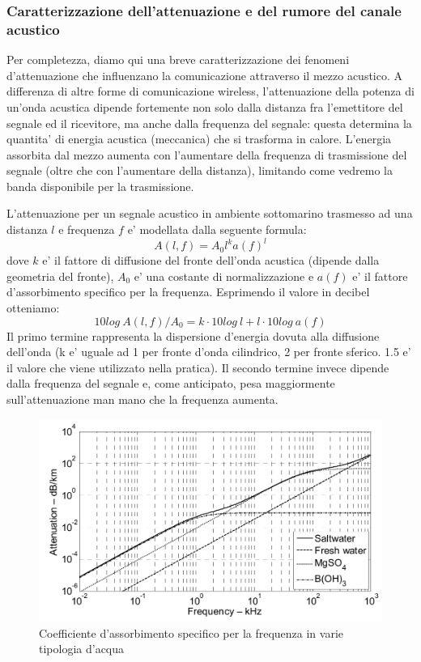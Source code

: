 \documentclass[Lau,binding=0.6cm]{sapthesis}
\begin{document}
\subsubsection{Caratterizzazione dell'attenuazione e del rumore del canale acustico}
\par
Per completezza, diamo qui una breve caratterizzazione dei fenomeni d'attenuazione che influenzano la comunicazione attraverso il mezzo acustico. A differenza di altre forme di comunicazione wireless, l'attenuazione della potenza di un'onda acustica dipende fortemente non solo dalla distanza fra l'emettitore del segnale ed il ricevitore, ma anche dalla frequenza del segnale: questa determina la quantita' di energia acustica (meccanica) che si trasforma in calore. L'energia assorbita dal mezzo aumenta con l'aumentare della frequenza di trasmissione del segnale (oltre che con l'aumentare della distanza), limitando come vedremo la banda disponibile per la trasmissione.

L'attenuazione per un segnale acustico in ambiente sottomarino trasmesso ad una distanza $l$ e frequenza $f$ e' modellata dalla seguente formula:
\[A(l, f) = A_0 l^k a(f)^l\]
dove $k$ e' il fattore di diffusione del fronte dell'onda acustica (dipende dalla geometria del fronte), $A_0$ e' una costante di normalizzazione e $a(f)$ e' il fattore d'assorbimento specifico per la frequenza.
Esprimendo il valore in decibel otteniamo:
\[10log\ A(l, f)/A_0 = k \cdot 10log\ l + l \cdot 10log\ a(f)\]
Il primo termine rappresenta la dispersione d'energia dovuta alla diffusione dell'onda (k e' uguale ad 1 per fronte d'onda cilindrico, 2 per fronte sferico. 1.5 e' il valore che viene utilizzato nella pratica). Il secondo termine invece dipende dalla frequenza del segnale e, come anticipato, pesa maggiormente sull'attenuazione man mano che la frequenza aumenta.

\begin{figure}[H]
    \centering
    \includegraphics[scale=1.4]{waterabsorption.jpeg}
    \caption{Coefficiente d'assorbimento specifico per la frequenza in varie tipologia d'acqua}
\end{figure}
\end{document}
